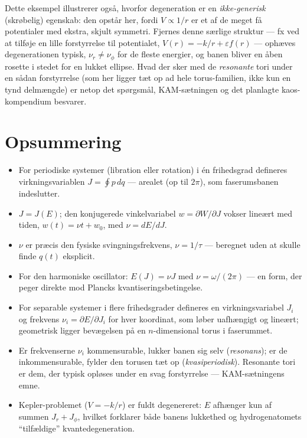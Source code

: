 \begin{eksempel}
\begin{bemaerkning}
Dette eksempel illustrerer også, hvorfor degeneration er en
\emph{ikke-generisk} (skrøbelig) egenskab: den opstår her, fordi
$V\propto1/r$ er et af de meget få potentialer med ekstra, skjult
symmetri. Fjernes denne særlige struktur — fx ved at tilføje en lille
forstyrrelse til potentialet, $V(r)=-k/r+\varepsilon f(r)$ — ophæves
degenerationen typisk, $\nu_r\neq\nu_\phi$ for de fleste energier, og
banen bliver en åben rosette i stedet for en lukket ellipse. Hvad der
sker med de \emph{resonante} tori under en sådan forstyrrelse (som
her ligger tæt op ad hele torus-familien, ikke kun en tynd
delmængde) er netop det spørgsmål, KAM-sætningen og det planlagte
kaos-kompendium besvarer.
\end{bemaerkning}
\end{eksempel}

\section{Opsummering}

\begin{itemize}
  \item For periodiske systemer (libration eller rotation) i én
        frihedsgrad defineres virkningsvariablen $J=\oint p\,dq$
        — arealet (op til $2\pi$), som faserumsbanen indeslutter.
  \item $J=J(E)$; den konjugerede vinkelvariabel $w=\partial W/\partial J$
        vokser lineært med tiden, $w(t)=\nu t+w_0$, med
        $\nu=dE/dJ$.
  \item $\nu$ er præcis den fysiske svingningsfrekvens,
        $\nu=1/\tau$ — beregnet uden at skulle finde $q(t)$ eksplicit.
  \item For den harmoniske oscillator: $E(J)=\nu J$ med
        $\nu=\omega/(2\pi)$ — en form, der peger direkte mod Plancks
        kvantiseringsbetingelse.
  \item For separable systemer i flere frihedsgrader defineres en
        virkningsvariabel $J_i$ og frekvens $\nu_i=\partial E/\partial J_i$
        for hver koordinat, som løber uafhængigt og lineært; geometrisk
        ligger bevægelsen på en $n$-dimensional torus i faserummet.
  \item Er frekvenserne $\nu_i$ kommensurable, lukker banen sig selv
        (\emph{resonans}); er de inkommensurable, fylder den torusen
        tæt op (\emph{kvasiperiodisk}). Resonante tori er dem, der
        typisk opløses under en svag forstyrrelse — KAM-sætningens
        emne.
  \item Kepler-problemet ($V=-k/r$) er fuldt degenereret: $E$ afhænger
        kun af summen $J_r+J_\phi$, hvilket forklarer både banens
        lukkethed og hydrogenatomets ``tilfældige'' kvantedegeneration.
\end{itemize}

